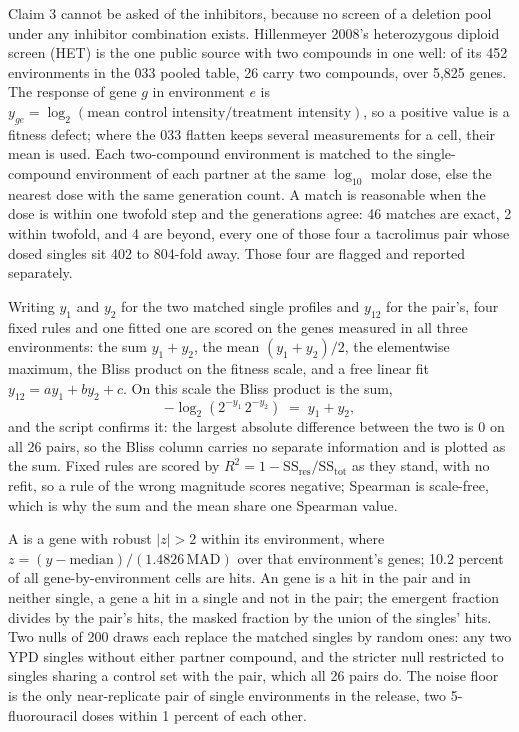 Claim 3 cannot be asked of the inhibitors, because no screen of a deletion pool under any
inhibitor combination exists. Hillenmeyer 2008's heterozygous diploid screen (HET) is the
one public source with two compounds in one well: of its 452 environments in the 033
pooled table, 26 carry two compounds, over 5,825 genes. The response of gene $g$ in
environment $e$ is
$y_{ge} = \log_2(\text{mean control intensity} / \text{treatment intensity})$, so a
positive value is a fitness defect; where the 033 flatten keeps several measurements for
a cell, their mean is used. Each two-compound environment is matched to the
single-compound environment of each partner at the same $\log_{10}$ molar dose, else the
nearest dose with the same generation count. A match is reasonable when the dose is
within one twofold step and the generations agree: 46 matches are exact, 2 within
twofold, and 4 are beyond, every one of those four a tacrolimus pair whose dosed singles
sit 402 to 804-fold away. Those four are flagged and reported separately.

Writing $y_1$ and $y_2$ for the two matched single profiles and $y_{12}$ for the pair's,
four fixed rules and one fitted one are scored on the genes measured in all three
environments: the sum $y_1 + y_2$, the mean $(y_1 + y_2)/2$, the elementwise maximum, the
Bliss product on the fitness scale, and a free linear fit $y_{12} = a y_1 + b y_2 + c$.
On this scale the Bliss product is the sum,
%
\begin{equation}
  -\log_2\!\left( 2^{-y_1} \, 2^{-y_2} \right) \;=\; y_1 + y_2 ,
  \label{eq:blisslog}
\end{equation}
%
and the script confirms it: the largest absolute difference between the two is 0 on all
26 pairs, so the Bliss column carries no separate information and is plotted as the sum.
Fixed rules are scored by $R^2 = 1 - \mathrm{SS}_{\text{res}} / \mathrm{SS}_{\text{tot}}$
as they stand, with no refit, so a rule of the wrong magnitude scores negative; Spearman
is scale-free, which is why the sum and the mean share one Spearman value.

A  is a gene with robust $|z| > 2$ within its environment, where
$z = (y - \mathrm{median}) / (1.4826\,\mathrm{MAD})$ over that environment's genes; 10.2
percent of all gene-by-environment cells are hits. An  gene is a hit in
the pair and in neither single, a  gene a hit in a single and not in the
pair; the emergent fraction divides by the pair's hits, the masked fraction by the union
of the singles' hits. Two nulls of 200 draws each replace the matched singles by random
ones: any two YPD singles without either partner compound, and the stricter null
restricted to singles sharing a control set with the pair, which all 26 pairs do. The
noise floor is the only near-replicate pair of single environments in the release, two
5-fluorouracil doses within 1 percent of each other.

